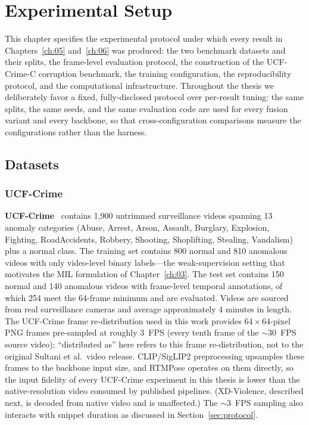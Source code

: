 \chapter{Experimental Setup}
\label{ch:04}

This chapter specifies the experimental protocol under which every result in
Chapters~\ref{ch:05} and~\ref{ch:06} was produced: the two benchmark datasets
and their splits, the frame-level evaluation protocol, the construction of the
UCF-Crime-C corruption benchmark, the training configuration, the
reproducibility protocol, and the computational infrastructure. Throughout the
thesis we deliberately favor a fixed, fully-disclosed protocol over per-result
tuning: the same splits, the same seeds, and the same evaluation code are used
for every fusion variant and every backbone, so that cross-configuration
comparisons measure the configurations rather than the harness.

\section{Datasets}
\label{sec:datasets}

\subsection{UCF-Crime}

\textbf{UCF-Crime}~\cite{sultani2018ucfcrime} contains 1,900 untrimmed
surveillance videos spanning 13 anomaly categories (Abuse, Arrest, Arson,
Assault, Burglary, Explosion, Fighting, RoadAccidents, Robbery, Shooting,
Shoplifting, Stealing, Vandalism) plus a normal class. The training set
contains 800 normal and 810 anomalous videos with only video-level binary
labels---the weak-supervision setting that motivates the MIL formulation of
Chapter~\ref{ch:03}. The test set contains 150 normal and 140 anomalous videos
with frame-level temporal annotations, of which 254 meet the 64-frame minimum
and are evaluated. Videos are sourced from real surveillance cameras and
average approximately 4 minutes in length. The UCF-Crime frame
re-distribution used in this work provides $64\times64$-pixel PNG frames
pre-sampled at roughly 3~FPS (every tenth frame of the ${\sim}30$~FPS source
video); ``distributed as'' here refers to this frame re-distribution, not to
the original Sultani et al.\ video release. CLIP/SigLIP2 preprocessing
upsamples these frames to the backbone input size, and RTMPose operates on
them directly, so the input fidelity of every UCF-Crime experiment in this
thesis is lower than the native-resolution video consumed by published
pipelines. (XD-Violence, described next, is decoded from native video and is
unaffected.) The ${\sim}3$~FPS sampling also interacts with snippet duration
as discussed in Section~\ref{sec:protocol}.

